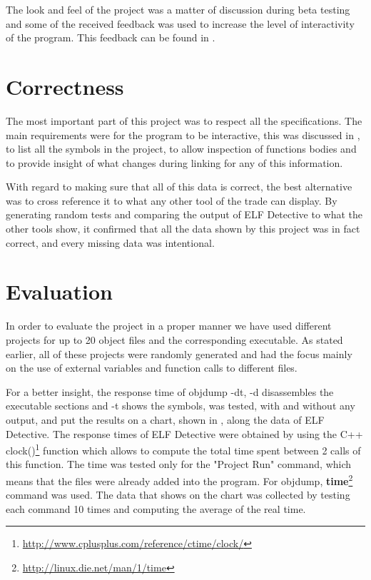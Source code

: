 The look and feel of the project was a matter of discussion during beta testing and some of the received feedback was used to increase the level of interactivity of the program. This feedback can be found in .

\section{Correctness}
\label{sec:correctness}

The most important part of this project was to respect all the specifications. The main requirements were for the program to be interactive, this was discussed in , to list all the symbols in the project, to allow inspection of functions bodies and to provide insight of what changes during linking for any of this information.

With regard to making sure that all of this data is correct, the best alternative was to cross reference it to what any other tool of the trade can display. By generating random tests and comparing the output of ELF Detective to what the other tools show, it confirmed that all the data shown by this project was in fact correct, and every missing data was intentional.

\section{Evaluation}
\label{sec:eval}

In order to evaluate the project in a proper manner we have used different projects for up to 20 object files and the corresponding executable. As stated earlier, all of these projects were randomly generated and had the focus mainly on the use of external variables and function calls to different files.


For a better insight, the response time of objdump -{}dt, -{}d disassembles the executable sections and -{}t shows the symbols, was tested, with and without any output, and put the results on a chart, shown in , along the data of ELF Detective. The response times of ELF Detective were obtained by using the C++ clock()\footnote{\url{http://www.cplusplus.com/reference/ctime/clock/}} function which allows to compute the total time spent between 2 calls of this function. The time was tested only for the "Project Run" command, which means that the files were already added into the program. For objdump,  \textbf{time}\footnote{\url{http://linux.die.net/man/1/time}} command was used. The data that shows on the chart was collected by testing each command 10 times and computing the average of the real time.

